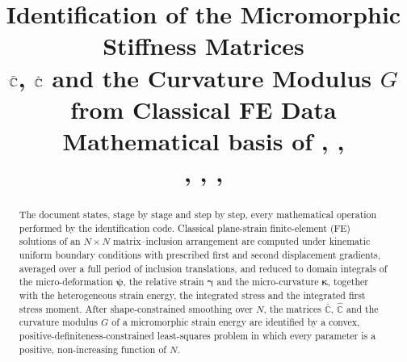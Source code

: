 \documentclass[11pt,a4paper]{article}
\title{Identification of the Micromorphic Stiffness Matrices\\
$\Cb$, $\Ch$ and the Curvature Modulus $G$ from Classical FE Data\\[4pt]
\large Mathematical basis of \code{main\_identify\_CbarChatG.m}, \code{dataGeneration.m},\\
\code{homogenize2D\_PBC.m}, \code{smoothData.m}, \code{identifyCbarChatG.m}, \code{plotAterms.m}}
\author{}
\date{}
\newcommand{\Cb}{\bar{\mathbb{C}}}              %
\newcommand{\Ch}{\hat{\mathbb{C}}}              %
\newcommand{\bpsi}{\bm{\psi}}
\newcommand{\bgam}{\bm{\gamma}}
\newcommand{\bkap}{\bm{\kappa}}
\theoremstyle{plain}
\theoremstyle{remark}
\begin{document}
\maketitle

\begin{abstract}
The document states, stage by stage and step by step, every mathematical operation performed by
the identification code. Classical plane-strain finite-element (FE) solutions of an $N\times N$
matrix--inclusion arrangement are computed under kinematic uniform boundary conditions with
prescribed first and second displacement gradients, averaged over a full period of inclusion
translations, and reduced to domain integrals of the micro-deformation $\bpsi$, the relative strain
$\bgam$ and the micro-curvature $\bkap$, together with the heterogeneous strain energy, the
integrated stress and the integrated first stress moment. After shape-constrained smoothing over
$N$, the matrices $\Cb$, $\Ch$ and the curvature modulus $G$ of a micromorphic strain energy are
identified by a convex, positive-definiteness-constrained least-squares problem in which every
parameter is a positive, non-increasing function of $N$.
\end{abstract}

\tableofcontents
\bigskip
\end{document}
